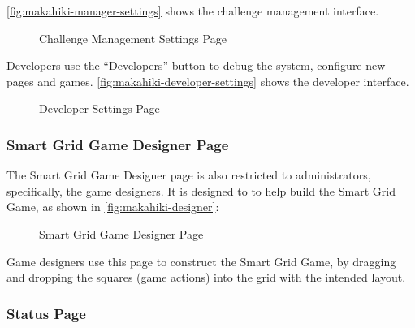 \autoref{fig:makahiki-manager-settings} shows the challenge management interface.

\begin{figure}[!ht]
\begin{center}
\end{center}
\caption{Challenge Management Settings Page}
\label{fig:makahiki-manager-settings}
\end{figure}

\clearpage

Developers use the ``Developers'' button to debug the system, configure new pages and games. \autoref{fig:makahiki-developer-settings} shows the developer interface.

\begin{figure}[!ht]
\begin{center}
\end{center}
\caption{Developer Settings Page}
\label{fig:makahiki-developer-settings}
\end{figure}

\clearpage

\subsubsection{Smart Grid Game Designer Page}

The Smart Grid Game Designer page is also restricted to administrators, specifically, the game designers. It is designed to to help build the Smart Grid Game, as shown in \autoref{fig:makahiki-designer}:

\begin{figure}[!ht]
\begin{center}
\end{center}
\caption{Smart Grid Game Designer Page}
\label{fig:makahiki-designer}
\end{figure}

Game designers use this page to construct the Smart Grid Game, by dragging and dropping the squares (game actions) into the grid with the intended layout.

\clearpage

\subsubsection{Status Page}

